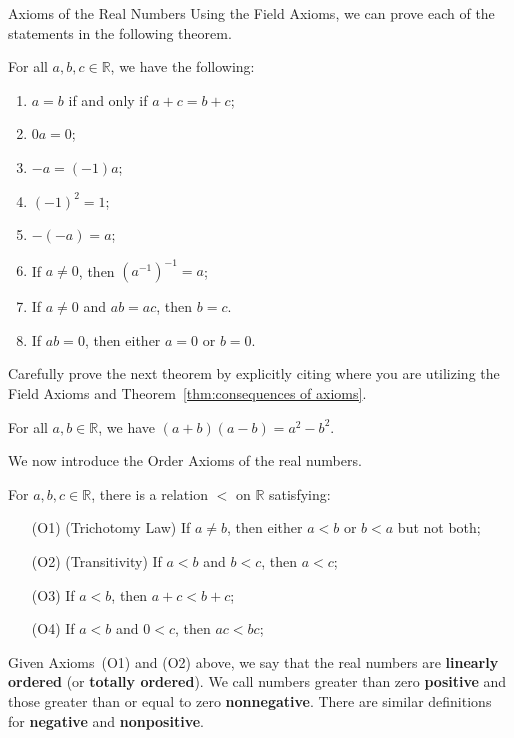 \begin{section}{Axioms of the Real Numbers}
Using the Field Axioms, we can prove each of the statements in the following theorem.

\begin{theorem}\label{thm:consequences of axioms}
For all $a,b,c\in\mathbb{R}$, we have the following:
\begin{enumerate}[label=\textrm{(\alph*)}]
\item $a=b$ if and only if $a+c=b+c$;
\item $0a=0$;
\item $-a=(-1)a$;
\item $(-1)^2 = 1$;
\item $-(-a)=a$;
\item If $a\neq 0$, then $(a^{-1})^{-1}=a$;
\item If $a\neq 0$ and $ab = ac$, then $b = c$.
\item If $ab=0$, then either $a=0$ or $b=0$.
\end{enumerate}
\end{theorem}

Carefully prove the next theorem by explicitly citing where you are utilizing the Field Axioms and Theorem~\ref{thm:consequences of axioms}.

\begin{theorem}
For all $a,b\in\mathbb{R}$, we have $(a+b)(a-b)=a^2-b^2$.
\end{theorem}

We now introduce the Order Axioms of the real numbers.

\begin{orderaxioms}\label{axiom:order axioms}
For $a,b,c\in \mathbb{R}$, there is a relation $\boxed{<}$ on $\mathbb{R}$ satisfying:
\begin{enumerate}
\item[(O1)] (Trichotomy Law) If $a\neq b$, then either $a<b$ or $b<a$ but not both;
\item[(O2)] (Transitivity) If $a<b$ and $b<c$, then $a<c$;
\item[(O3)] If $a<b$, then $a+c<b+c$;
\item[(O4)] If $a<b$ and $0<c$, then $ac<bc$;  
\end{enumerate}
\end{orderaxioms}

Given Axioms~(O1) and (O2) above, we say that the real numbers are \textbf{linearly ordered} (or \textbf{totally ordered}). We call numbers greater than zero \textbf{positive} and those greater than or equal to zero \textbf{nonnegative}. There are similar definitions for \textbf{negative} and \textbf{nonpositive}. 


\end{section}
